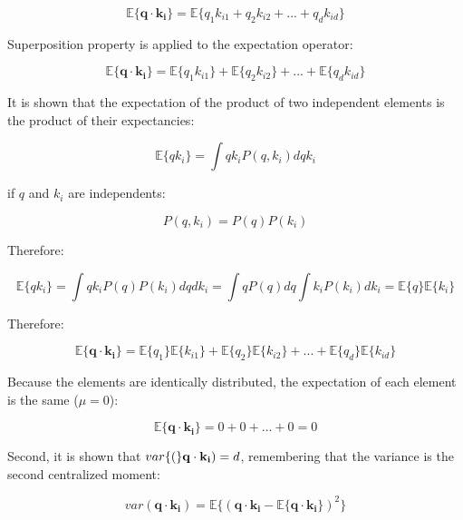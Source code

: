 \begin{equation}
    \mathbb{E}\{\mathbf{q} \cdot{} \mathbf{k_i}\}=\mathbb{E}\{q_1k_{i1}+q_2k_{i2}+...+q_dk_{id}\}
\end{equation}

Superposition property is applied to the expectation operator:

\begin{equation}
    \mathbb{E}\{\mathbf{q} \cdot{} \mathbf{k_i}\}=\mathbb{E}\{q_1k_{i1}\}+\mathbb{E}\{q_2k_{i2}\}+...+\mathbb{E}\{q_dk_{id}\}
\end{equation}

It is shown that the expectation of the product of two independent elements is the product of their expectancies:

\begin{equation}
    \mathbb{E}\{qk_i\}= \int qk_iP(q,k_i)dqk_i
\end{equation}

if $q$ and $k_i$ are independents:

\begin{equation}
    P(q,k_i)=P(q)P(k_i)
\end{equation}


Therefore:

\begin{equation}
    \mathbb{E}\{qk_i\}= \int qk_iP(q)P(k_i)dqdk_i=\int qP(q)dq \int k_i P(k_i)dk_i = \mathbb{E}\{q\}\mathbb{E}\{k_i\}
\end{equation}

Therefore:

\begin{equation}
    \mathbb{E}\{\mathbf{q} \cdot{} \mathbf{k_i}\}=\mathbb{E}\{q_1\}\mathbb{E}\{k_{i1}\}+\mathbb{E}\{q_2\}\mathbb{E}\{k_{i2}\}+...+\mathbb{E}\{q_d\}\mathbb{E}\{k_{id}\}
\end{equation}

Because the elements are identically distributed, the expectation of each element is the same ($\mu=0$):

\begin{equation}
    \mathbb{E}\{\mathbf{q} \cdot{} \mathbf{k_i}\}=0+0+...+0=0
\end{equation}

Second, it is shown that ${var}\{(\}\mathbf{q} \cdot{} \mathbf{k_i})=d$, remembering that the variance is the second centralized moment:

\begin{equation}
    var(\mathbf{q} \cdot{} \mathbf{k_i})=\mathbb{E}\{(\mathbf{q} \cdot{} \mathbf{k_i}-\mathbb{E}\{\mathbf{q} \cdot{} \mathbf{k_i}\})^2\}
\end{equation}


